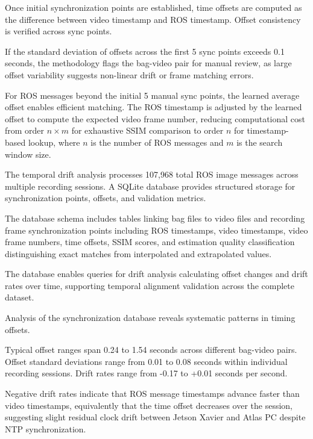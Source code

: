 \documentclass{erauthesis}
\begin{document}

Once initial synchronization points are established, time offsets are computed as the difference between video timestamp and ROS timestamp.
Offset consistency is verified across sync points.

If the standard deviation of offsets across the first 5 sync points exceeds 0.1 seconds, the methodology flags the bag-video pair for manual review, as large offset variability suggests non-linear drift or frame matching errors.


For ROS messages beyond the initial 5 manual sync points, the learned average offset enables efficient matching.
The ROS timestamp is adjusted by the learned offset to compute the expected video frame number, reducing computational cost from order $n \times m$ for exhaustive SSIM comparison to order $n$ for timestamp-based lookup, where $n$ is the number of ROS messages and $m$ is the search window size.


The temporal drift analysis processes 107,968 total ROS image messages across multiple recording sessions.
A SQLite database provides structured storage for synchronization points, offsets, and validation metrics.

The database schema includes tables linking bag files to video files and recording frame synchronization points including ROS timestamps, video timestamps, video frame numbers, time offsets, SSIM scores, and estimation quality classification distinguishing exact matches from interpolated and extrapolated values.

The database enables queries for drift analysis calculating offset changes and drift rates over time, supporting temporal alignment validation across the complete dataset.


Analysis of the synchronization database reveals systematic patterns in timing offsets.


Typical offset ranges span 0.24 to 1.54 seconds across different bag-video pairs.
Offset standard deviations range from 0.01 to 0.08 seconds within individual recording sessions.
Drift rates range from -0.17 to +0.01 seconds per second.

Negative drift rates indicate that ROS message timestamps advance faster than video timestamps, equivalently that the time offset decreases over the session, suggesting slight residual clock drift between Jetson Xavier and Atlas PC despite NTP synchronization.
\end{document}
